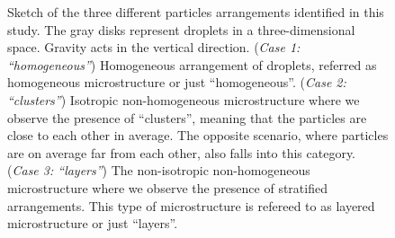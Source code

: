 \begin{figure}
\hfill
\caption{Sketch of the three different particles arrangements identified in this study.
The gray disks represent droplets in a three-dimensional space. 
Gravity acts in the vertical direction.
(\textit{Case 1: ``homogeneous''}) Homogeneous arrangement of droplets, referred as homogeneous microstructure or just ``homogeneous''.
(\textit{Case 2: ``clusters''}) Isotropic non-homogeneous microstructure where we  observe the presence of ``clusters'', meaning that the particles are close to each other in average.
The opposite scenario, where particles are on average far from each other, also falls into this category. 
(\textit{Case 3: ``layers''}) The non-isotropic non-homogeneous microstructure where we observe the presence of stratified arrangements.
This type of microstructure is refereed to as layered microstructure or just ``layers''. 
}
\label{fig:scheme_clusters}
\end{figure}
